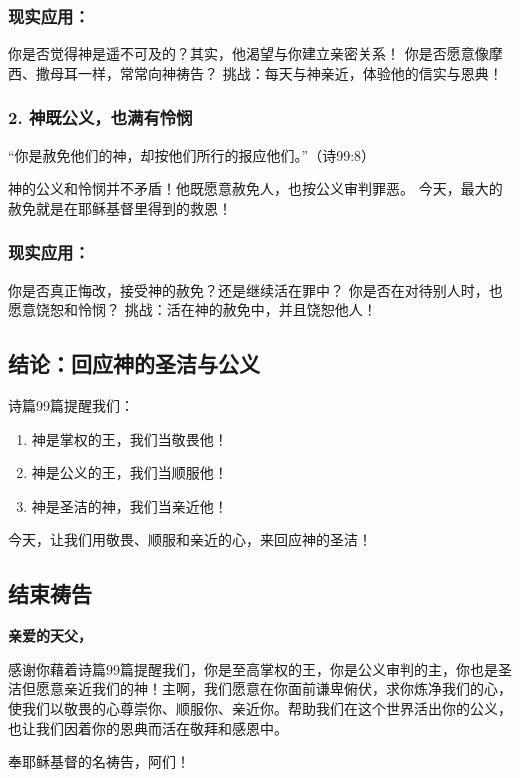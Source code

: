 \documentclass[a4paper, 12pt]{article}
\begin{document}
\subsubsection*{现实应用：}

你是否觉得神是遥不可及的？其实，他渴望与你建立亲密关系！
你是否愿意像摩西、撒母耳一样，常常向神祷告？
挑战：每天与神亲近，体验他的信实与恩典！

\subsubsection*{2. 神既公义，也满有怜悯}
“你是赦免他们的神，却按他们所行的报应他们。”（诗99:8）

神的公义和怜悯并不矛盾！他既愿意赦免人，也按公义审判罪恶。
今天，最大的赦免就是在耶稣基督里得到的救恩！
\subsubsection*{现实应用：}

你是否真正悔改，接受神的赦免？还是继续活在罪中？
你是否在对待别人时，也愿意饶恕和怜悯？
挑战：活在神的赦免中，并且饶恕他人！

\subsection*{结论：回应神的圣洁与公义}
诗篇99篇提醒我们：
\begin{enumerate}
    \item 神是掌权的王，我们当敬畏他！

    \item 神是公义的王，我们当顺服他！

    \item 神是圣洁的神，我们当亲近他！

\end{enumerate}

今天，让我们用敬畏、顺服和亲近的心，来回应神的圣洁！

\subsection*{结束祷告}
\textbf{亲爱的天父，}

感谢你藉着诗篇99篇提醒我们，你是至高掌权的王，你是公义审判的主，你也是圣洁但愿意亲近我们的神！主啊，我们愿意在你面前谦卑俯伏，求你炼净我们的心，使我们以敬畏的心尊崇你、顺服你、亲近你。帮助我们在这个世界活出你的公义，也让我们因着你的恩典而活在敬拜和感恩中。

奉耶稣基督的名祷告，阿们！
\newpage
\end{document}
